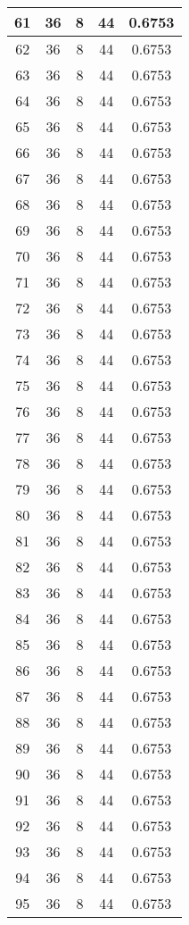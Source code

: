 \documentclass[letterpaper, 12pt]{article}
\begin{document}
\begin{longtable}{|c|c|c|c|c|}
\hline
61 & 36 & 8 & 44 & 0.6753 \\
\hline
62 & 36 & 8 & 44 & 0.6753 \\
\hline
63 & 36 & 8 & 44 & 0.6753 \\
\hline
64 & 36 & 8 & 44 & 0.6753 \\
\hline
65 & 36 & 8 & 44 & 0.6753 \\
\hline
66 & 36 & 8 & 44 & 0.6753 \\
\hline
67 & 36 & 8 & 44 & 0.6753 \\
\hline
68 & 36 & 8 & 44 & 0.6753 \\
\hline
69 & 36 & 8 & 44 & 0.6753 \\
\hline
70 & 36 & 8 & 44 & 0.6753 \\
\hline
71 & 36 & 8 & 44 & 0.6753 \\
\hline
72 & 36 & 8 & 44 & 0.6753 \\
\hline
73 & 36 & 8 & 44 & 0.6753 \\
\hline
74 & 36 & 8 & 44 & 0.6753 \\
\hline
75 & 36 & 8 & 44 & 0.6753 \\
\hline
76 & 36 & 8 & 44 & 0.6753 \\
\hline
77 & 36 & 8 & 44 & 0.6753 \\
\hline
78 & 36 & 8 & 44 & 0.6753 \\
\hline
79 & 36 & 8 & 44 & 0.6753 \\
\hline
80 & 36 & 8 & 44 & 0.6753 \\
\hline
81 & 36 & 8 & 44 & 0.6753 \\
\hline
82 & 36 & 8 & 44 & 0.6753 \\
\hline
83 & 36 & 8 & 44 & 0.6753 \\
\hline
84 & 36 & 8 & 44 & 0.6753 \\
\hline
85 & 36 & 8 & 44 & 0.6753 \\
\hline
86 & 36 & 8 & 44 & 0.6753 \\
\hline
87 & 36 & 8 & 44 & 0.6753 \\
\hline
88 & 36 & 8 & 44 & 0.6753 \\
\hline
89 & 36 & 8 & 44 & 0.6753 \\
\hline
90 & 36 & 8 & 44 & 0.6753 \\
\hline
91 & 36 & 8 & 44 & 0.6753 \\
\hline
92 & 36 & 8 & 44 & 0.6753 \\
\hline
93 & 36 & 8 & 44 & 0.6753 \\
\hline
94 & 36 & 8 & 44 & 0.6753 \\
\hline
95 & 36 & 8 & 44 & 0.6753 \\

\end{longtable}
\end{document}

